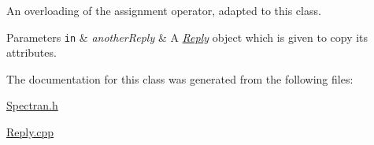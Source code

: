 An overloading of the assignment operator, adapted to this class. 


\begin{DoxyParams}[1]{Parameters}
\mbox{\tt in}  & {\em another\+Reply} & A {\itshape \hyperlink{classReply}{Reply}} object which is given to copy its attributes. \\
\hline
\end{DoxyParams}


The documentation for this class was generated from the following files\+:\begin{DoxyCompactItemize}
\item 
\hyperlink{Spectran_8h}{Spectran.\+h}\item 
\hyperlink{Reply_8cpp}{Reply.\+cpp}\end{DoxyCompactItemize}
